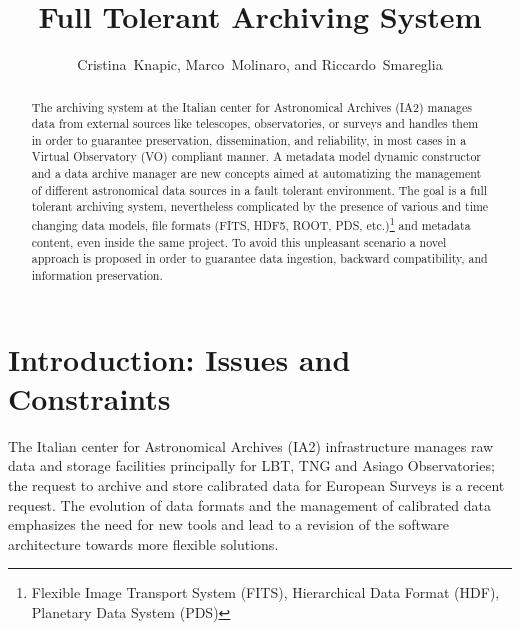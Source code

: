 
\resetcounters



\title{Full Tolerant Archiving System}
\author{Cristina~Knapic, Marco~Molinaro, and Riccardo~Smareglia
}


\begin{abstract}
The archiving system at the Italian center for Astronomical Archives (IA2) manages data from external sources like telescopes, observatories, or surveys and handles them in order to guarantee preservation, dissemination, and reliability, in most cases in a Virtual Observatory (VO) compliant manner. A metadata model dynamic constructor and a data archive manager are new concepts aimed at automatizing the management of different astronomical data sources in a fault tolerant environment. The goal is a full tolerant archiving system, nevertheless complicated by the presence of various and time changing data models, file formats (FITS, HDF5, ROOT, PDS, etc.)\footnote{Flexible Image Transport System (FITS), Hierarchical Data Format (HDF), Planetary Data System (PDS)} and metadata content, even inside the same project. To avoid this unpleasant scenario a novel approach is proposed in order to guarantee data ingestion, backward compatibility, and information preservation.
\end{abstract}

\section{Introduction: Issues and Constraints}
The Italian center for Astronomical Archives (IA2) infrastructure manages raw data and storage facilities principally for LBT, TNG and Asiago Observatories; the request to archive and store calibrated data for European Surveys is a recent request. The evolution of data formats and the management of calibrated data emphasizes the need for new tools and lead to a revision of the software architecture towards more flexible solutions.

